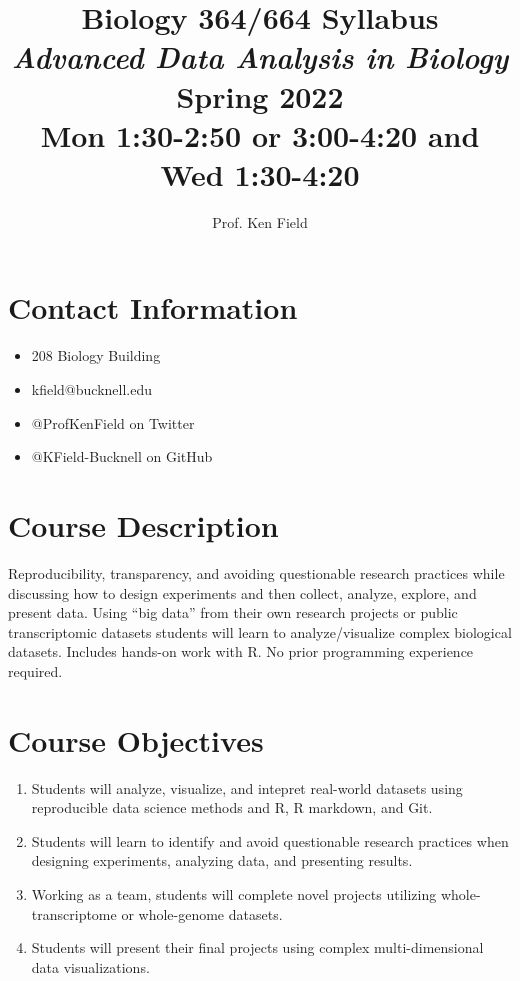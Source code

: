 \documentclass[11pt]{article} %
\title{Biology 364/664 Syllabus \\ \emph{Advanced Data Analysis in Biology} \\ Spring 2022 	\\
Mon 1:30-2:50 or 3:00-4:20 and Wed 1:30-4:20}
\author{Prof. Ken Field}
\begin{document}
\maketitle



\section{Contact Information}
  \begin{itemize}
  	\item 208 Biology Building
  	\item kfield@bucknell.edu
  	\item @ProfKenField on Twitter
  	\item @KField-Bucknell on GitHub
  \end{itemize}
  
  
\section{Course Description}

Reproducibility, transparency, and avoiding questionable research practices while discussing how to design experiments and then collect, analyze, explore, and present data. Using “big data” from their own research projects or public transcriptomic datasets students will learn to analyze/visualize complex biological datasets. Includes hands-on work with R. No prior programming experience required. 
    
    
\section{Course Objectives}\label{course-objectives}

\begin{enumerate}
\def\labelenumi{\arabic{enumi}.}
\item
  Students will analyze, visualize, and intepret real-world
  datasets using reproducible data science methods and R, R markdown, and Git.
\item
  Students will learn to identify and avoid questionable research practices 
  when designing experiments, analyzing data, and presenting results.
\item
  Working as a team, students will complete novel projects utilizing
  whole-transcriptome or whole-genome datasets.
\item
  Students will present their final projects using complex
  multi-dimensional data visualizations.
\end{enumerate}
\end{document}

